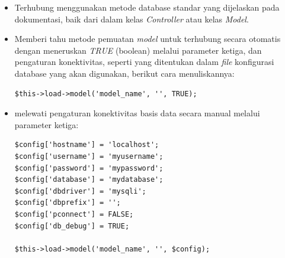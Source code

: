     \begin{itemize}
        \item Terhubung menggunakan metode database standar yang dijelaskan pada dokumentasi, baik dari dalam kelas \textit{Controller} atau kelas \textit{Model}.
        \item Memberi tahu metode pemuatan \textit{model} untuk terhubung secara otomatis dengan meneruskan \textit{TRUE} (boolean) melalui parameter ketiga, dan pengaturan konektivitas, seperti yang ditentukan dalam \textit{file} konfigurasi database yang akan digunakan, berikut cara menuliskannya: 
        \begin{lstlisting}[basicstyle=\ttfamily, frame=single,
        columns=fullflexible, breaklines=true, numbers=none]
$this->load->model('model_name', '', TRUE);
    \end{lstlisting}
    \item melewati pengaturan konektivitas basis data secara manual melalui parameter ketiga:
    \begin{lstlisting}[basicstyle=\ttfamily, frame=single,
        columns=fullflexible, breaklines=true, numbers=none]
$config['hostname'] = 'localhost';
$config['username'] = 'myusername';
$config['password'] = 'mypassword';
$config['database'] = 'mydatabase';
$config['dbdriver'] = 'mysqli';
$config['dbprefix'] = '';
$config['pconnect'] = FALSE;
$config['db_debug'] = TRUE;

$this->load->model('model_name', '', $config);
    \end{lstlisting}
    \end{itemize}
